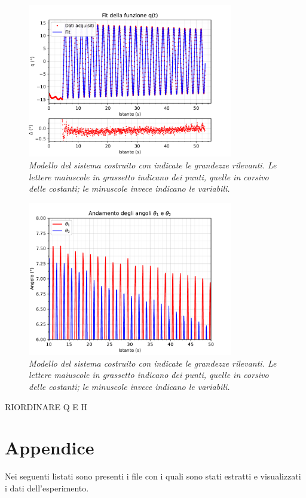 \documentclass[11pt, a4paper, twoside]{article}
\begin{document}
\begin{figure}[h!]
  \centering
  \includegraphics[width=0.8\textwidth]{../../media/plot/fit_q.pdf}
  \caption{\textit{Modello del sistema costruito con indicate
   le grandezze rilevanti. Le lettere maiuscole in grassetto indicano dei punti, quelle in corsivo delle 
   costanti; le minuscole invece indicano le variabili.} }
  \label{fit_q}
\end{figure}

\begin{figure}[h!]
  \centering
  \includegraphics[width=0.8\textwidth]{../../media/plot/angles_decrease.pdf}
  \caption{\textit{Modello del sistema costruito con indicate
   le grandezze rilevanti. Le lettere maiuscole in grassetto indicano dei punti, quelle in corsivo delle 
   costanti; le minuscole invece indicano le variabili.} }
  \label{angles_decrease}
\end{figure}



RIORDINARE Q E H 


\section{Appendice}
Nei seguenti listati sono presenti i file con i quali sono stati estratti 
e visualizzati i dati dell'esperimento.
\end{document}
